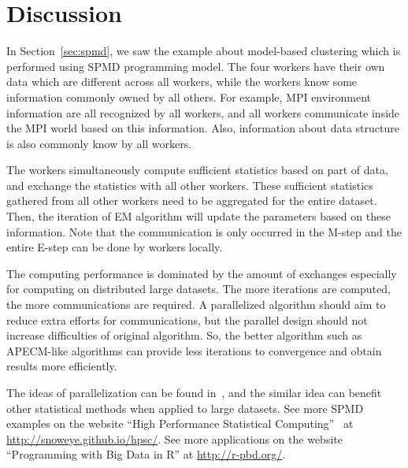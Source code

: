\section[Discussion]{Discussion}
\label{sec:discussion}

In Section~\ref{sec:spmd}, we saw the example about model-based clustering
which is performed using SPMD programming model.
The four workers have their own data which are different across all workers,
while the workers know some information commonly owned by all others.
For example, MPI environment information are all recognized by all workers,
and all workers communicate inside the MPI world based on this information.
Also, information about data structure is also commonly know by all workers.

The workers simultaneously compute sufficient statistics based on part of data,
and exchange the statistics with all other workers.
These sufficient statistics gathered from all other workers
need to be aggregated for the entire dataset.
Then, the iteration of EM algorithm will update the parameters
based on these information.
Note that the communication is only occurred in the M-step and the
entire E-step can be done by workers locally.

The computing performance is dominated by the amount of exchanges especially
for computing on distributed large datasets.
The more iterations are computed, the more communications are required.
A parallelized algorithm should aim to reduce extra efforts for
communications, but the parallel design should not increase difficulties
of original algorithm.
So, the better algorithm such as APECM-like algorithms can provide
less iterations to convergence and obtain results more efficiently.

The ideas of parallelization can be found in~\citet{Chen2012a},
and the similar idea can benefit other statistical methods when
applied to large datasets.
See more SPMD examples on the website
``High Performance Statistical Computing''~\citep{hpsc2012} at
\url{http://snoweye.github.io/hpsc/}.
See more applications on the website
``Programming with Big Data in R'' at
\url{http://r-pbd.org/}.
